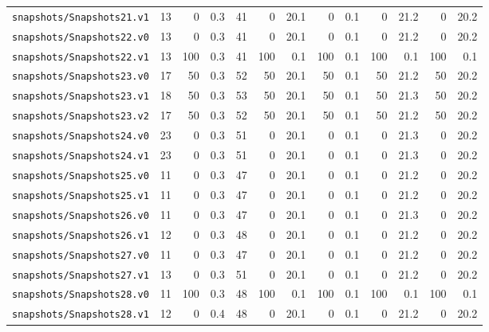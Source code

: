 \documentclass[a4paper,final]{llncs}
\begin{document}
\begin{scriptsize}
\begin{longtable}{l |r *{1}{rr} |r *{4}{rr}}
\verb|snapshots/Snapshots21.v1|  &  13  &  0  &  0.3  &  41  &  0  &  20.1  &  0  &  0.1  &  0  &  21.2  &  0  &  20.2  \\
\verb|snapshots/Snapshots22.v0|  &  13  &  0  &  0.3  &  41  &  0  &  20.1  &  0  &  0.1  &  0  &  21.2  &  0  &  20.2  \\
\verb|snapshots/Snapshots22.v1|  &  13  &  100  &  0.3  &  41  &  100  &  0.1  &  100  &  0.1  &  100  &  0.1  &  100  &  0.1  \\
\verb|snapshots/Snapshots23.v0|  &  17  &  50  &  0.3  &  52  &  50  &  20.1  &  50  &  0.1  &  50  &  21.2  &  50  &  20.2  \\
\verb|snapshots/Snapshots23.v1|  &  18  &  50  &  0.3  &  53  &  50  &  20.1  &  50  &  0.1  &  50  &  21.3  &  50  &  20.2  \\
\verb|snapshots/Snapshots23.v2|  &  17  &  50  &  0.3  &  52  &  50  &  20.1  &  50  &  0.1  &  50  &  21.2  &  50  &  20.2  \\
\verb|snapshots/Snapshots24.v0|  &  23  &  0  &  0.3  &  51  &  0  &  20.1  &  0  &  0.1  &  0  &  21.3  &  0  &  20.2  \\
\verb|snapshots/Snapshots24.v1|  &  23  &  0  &  0.3  &  51  &  0  &  20.1  &  0  &  0.1  &  0  &  21.3  &  0  &  20.2  \\
\verb|snapshots/Snapshots25.v0|  &  11  &  0  &  0.3  &  47  &  0  &  20.1  &  0  &  0.1  &  0  &  21.2  &  0  &  20.2  \\
\verb|snapshots/Snapshots25.v1|  &  11  &  0  &  0.3  &  47  &  0  &  20.1  &  0  &  0.1  &  0  &  21.2  &  0  &  20.2  \\
\verb|snapshots/Snapshots26.v0|  &  11  &  0  &  0.3  &  47  &  0  &  20.1  &  0  &  0.1  &  0  &  21.3  &  0  &  20.2  \\
\verb|snapshots/Snapshots26.v1|  &  12  &  0  &  0.3  &  48  &  0  &  20.1  &  0  &  0.1  &  0  &  21.2  &  0  &  20.2  \\
\verb|snapshots/Snapshots27.v0|  &  11  &  0  &  0.3  &  47  &  0  &  20.1  &  0  &  0.1  &  0  &  21.2  &  0  &  20.2  \\
\verb|snapshots/Snapshots27.v1|  &  13  &  0  &  0.3  &  51  &  0  &  20.1  &  0  &  0.1  &  0  &  21.2  &  0  &  20.2  \\
\verb|snapshots/Snapshots28.v0|  &  11  &  100  &  0.3  &  48  &  100  &  0.1  &  100  &  0.1  &  100  &  0.1  &  100  &  0.1  \\
\verb|snapshots/Snapshots28.v1|  &  12  &  0  &  0.4  &  48  &  0  &  20.1  &  0  &  0.1  &  0  &  21.2  &  0  &  20.2  \\

\end{longtable}
\end{scriptsize}
\end{document}

